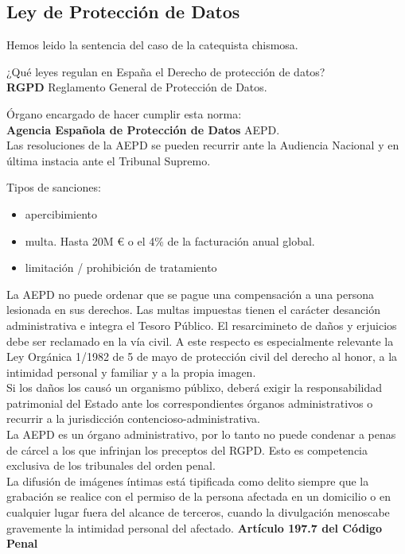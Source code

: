 \documentclass[spanish, 12pt, a4paper, twoside]{article}
\begin{document}
\subsection{Ley de Protección de Datos}

Hemos leido la sentencia del caso de la catequista chismosa.

¿Qué leyes regulan en España el Derecho de protección de datos?\\
\textbf{RGPD} Reglamento General de Protección de Datos.

Órgano encargado de hacer cumplir esta norma:\\
\textbf{Agencia Española de Protección de Datos} AEPD.\\
Las resoluciones de la AEPD se pueden recurrir ante la Audiencia Nacional y en última instacia 
ante el Tribunal Supremo.

\hfill\break
Tipos de sanciones:
\begin{itemize}
    \item apercibimiento
    \item multa. Hasta 20M € o el 4\% de la facturación anual global.
    \item limitación / prohibición de tratamiento
\end{itemize}


La AEPD no puede ordenar que se pague una compensación a una persona lesionada en sus derechos. Las multas
impuestas tienen el carácter desanción administrativa e integra el Tesoro Público.
El resarcimineto de daños y erjuicios debe ser reclamado en la vía civil. A este respecto es especialmente relevante la 
Ley Orgánica 1/1982 de 5 de mayo de protección civil del derecho al honor, a la intimidad personal y familiar y a la propia imagen.\\

Si los daños los causó un organismo públixo, deberá exigir la responsabilidad patrimonial del Estado ante los correspondientes órganos
administrativos o recurrir a la jurisdicción contencioso-administrativa.\\


La AEPD es un órgano administrativo, por lo tanto no puede condenar a penas de cárcel a los que infrinjan los preceptos del RGPD.
Esto es competencia exclusiva de los tribunales del orden penal.\\


La difusión de imágenes íntimas está tipificada como delito siempre que la grabación se realice con el permiso 
de la persona afectada en un domicilio o en cualquier lugar fuera del alcance de terceros, cuando la divulgación menoscabe gravemente la intimidad personal del afectado. \textbf{Artículo 197.7 del Código Penal}\\
\end{document}
